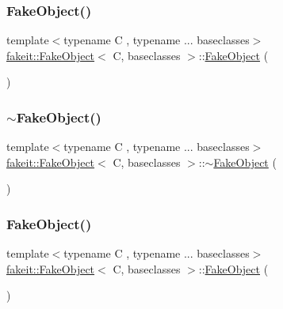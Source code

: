 \subsubsection{\texorpdfstring{FakeObject()}{FakeObject()}\hspace{0.1cm}{\footnotesize\ttfamily [5/9]}}
{\footnotesize\ttfamily template$<$typename C , typename ... baseclasses$>$ \\
\mbox{\hyperlink{classfakeit_1_1FakeObject}{fakeit\+::\+Fake\+Object}}$<$ C, baseclasses $>$\+::\mbox{\hyperlink{classfakeit_1_1FakeObject}{Fake\+Object}} (\begin{DoxyParamCaption}{ }\end{DoxyParamCaption})\hspace{0.3cm}{\ttfamily [inline]}}

\mbox{\label{classfakeit_1_1FakeObject_abfc9604c62598655fdefcc98a329dbbf}} 
\subsubsection{\texorpdfstring{$\sim$FakeObject()}{~FakeObject()}\hspace{0.1cm}{\footnotesize\ttfamily [5/9]}}
{\footnotesize\ttfamily template$<$typename C , typename ... baseclasses$>$ \\
\mbox{\hyperlink{classfakeit_1_1FakeObject}{fakeit\+::\+Fake\+Object}}$<$ C, baseclasses $>$\+::$\sim$\mbox{\hyperlink{classfakeit_1_1FakeObject}{Fake\+Object}} (\begin{DoxyParamCaption}{ }\end{DoxyParamCaption})\hspace{0.3cm}{\ttfamily [inline]}}

\mbox{\label{classfakeit_1_1FakeObject_ad705c5388b4354d1fdeef0bdd0151167}} 
\subsubsection{\texorpdfstring{FakeObject()}{FakeObject()}\hspace{0.1cm}{\footnotesize\ttfamily [6/9]}}
{\footnotesize\ttfamily template$<$typename C , typename ... baseclasses$>$ \\
\mbox{\hyperlink{classfakeit_1_1FakeObject}{fakeit\+::\+Fake\+Object}}$<$ C, baseclasses $>$\+::\mbox{\hyperlink{classfakeit_1_1FakeObject}{Fake\+Object}} (\begin{DoxyParamCaption}{ }\end{DoxyParamCaption})\hspace{0.3cm}{\ttfamily [inline]}}


